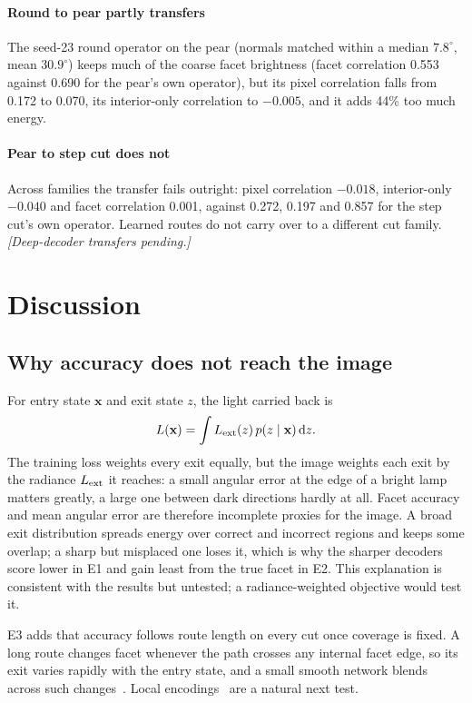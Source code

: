 \documentclass[conference]{IEEEtran}
\newcommand{\dg}{^{\circ}}
\begin{document}
\paragraph{Round to pear partly transfers} The seed-23 round operator on the pear
(normals matched within a median $7.8\dg$, mean $30.9\dg$) keeps much of the
coarse facet brightness (facet correlation 0.553 against 0.690 for the pear's own
operator), but its pixel correlation falls from 0.172 to 0.070, its
interior-only correlation to $-0.005$, and it adds 44\% too much energy.

\paragraph{Pear to step cut does not} Across families the transfer fails
outright: pixel correlation $-0.018$, interior-only $-0.040$ and facet
correlation 0.001, against 0.272, 0.197 and 0.857 for the step cut's own
operator. Learned routes do not carry over to a different cut family.
\emph{[Deep-decoder transfers pending.]}

\section{Discussion}
\subsection{Why accuracy does not reach the image}
For entry state $\mathbf{x}$ and exit state $z$, the light carried back is
\begin{equation}
 L(\mathbf{x})=\int L_{\rm ext}(z)\,p(z\mid\mathbf{x})\,\mathrm{d}z.
\end{equation}
The training loss weights every exit equally, but the image weights each exit
by the radiance $L_{\rm ext}$ it reaches: a small angular error at the edge of a
bright lamp matters greatly, a large one between dark directions hardly at all.
Facet accuracy and mean angular error are therefore incomplete proxies for the
image. A broad exit distribution spreads energy over correct and incorrect
regions and keeps some overlap; a sharp but misplaced one loses it, which is why
the sharper decoders score lower in E1 and gain least from the true facet in E2.
This explanation is consistent with the results but untested; a
radiance-weighted objective would test it.

E3 adds that accuracy follows route length on every cut once coverage is fixed.
A long route changes facet whenever the path crosses any internal facet edge, so
its exit varies rapidly with the entry state, and a small smooth network blends
across such changes~\cite{rahaman2019}. Local encodings~\cite{muller2022ngp} are
a natural next test.
\end{document}
